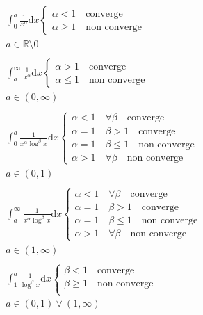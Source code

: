 \documentclass[a4paper]{article}
\begin{document}
\begin{equation*}
    \begin{gathered}
        \int_0^a{\frac{1}{x^\alpha}\text{d}x}
        \begin{cases}
            \alpha<1   \quad \text{converge}\\
            \alpha\ge1 \quad \text{non converge}
        \end{cases}
        \\
        a \in \mathbb{R} \setminus {0}
        \\
        \\
        \int_a^\infty{\frac{1}{x^\alpha}\text{d}x}
        \begin{cases}
            \alpha>1   \quad \text{converge}\\
            \alpha\le1 \quad \text{non converge}
        \end{cases}
        \\
        a \in (0, \infty)
        \\
        \\
        \int_0^a{\frac{1}{x^\alpha\log^{\beta} x}\text{d}x}
        \begin{cases}
            \alpha<1 \quad \forall\beta\quad \text{converge}\\
            \alpha=1 \quad \beta>1     \quad \text{converge}\\
            \alpha=1 \quad \beta\le1   \quad \text{non converge}\\
            \alpha>1 \quad \forall\beta\quad \text{non converge}
        \end{cases}
        \\
        a \in (0,1)
        \\
        \\
        \int_a^\infty{\frac{1}{x^\alpha\log^{\beta} x}\text{d}x}
        \begin{cases}
            \alpha<1 \quad \forall\beta\quad \text{converge}\\
            \alpha=1 \quad \beta>1     \quad \text{converge}\\
            \alpha=1 \quad \beta\le1   \quad \text{non converge}\\
            \alpha>1 \quad \forall\beta\quad \text{non converge}
        \end{cases}
        \\
        a \in (1, \infty)
        \\
        \\
        \int_1^a{\frac{1}{\log^{\beta} x}\text{d}x}
        \begin{cases}
            \beta<1   \quad \text{converge}\\
            \beta\ge1 \quad \text{non converge}\\
            \end{cases}
        \\
        a \in (0,1) \vee (1, \infty)
        \\
    \end{gathered}
\end{equation*}
\end{document}
